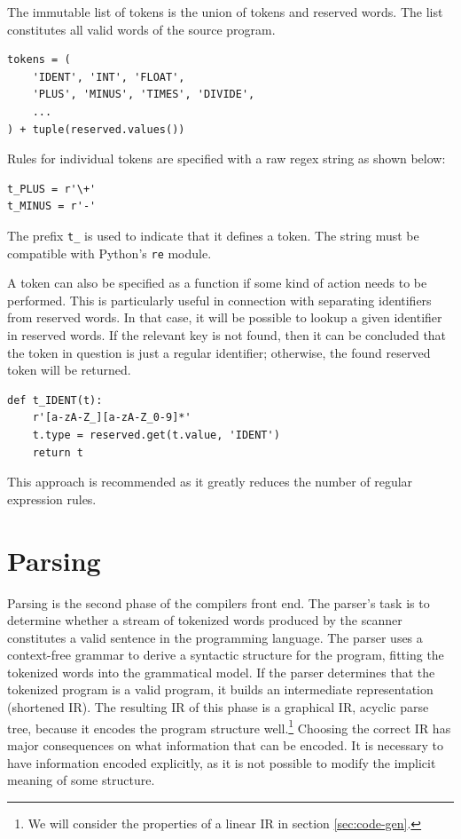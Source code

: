 The immutable list of tokens is the union of tokens and reserved words. The list constitutes all valid words of the source program.

\begin{verbatim}
tokens = (
    'IDENT', 'INT', 'FLOAT',
    'PLUS', 'MINUS', 'TIMES', 'DIVIDE',
    ...
) + tuple(reserved.values())
\end{verbatim}

Rules for individual tokens are specified with a raw regex string as shown below:

\begin{verbatim}
t_PLUS = r'\+'
t_MINUS = r'-'
\end{verbatim}

The prefix \texttt{t\_} is used to indicate that it defines a token. The string must be compatible with Python's \texttt{re} module.

A token can also be specified as a function if some kind of action needs to be performed. This is particularly useful in connection with separating identifiers from reserved words. In that case, it will be possible to lookup a given identifier in reserved words. If the relevant key is not found, then it can be concluded that the token in question is just a regular identifier; otherwise, the found reserved token will be returned.

\begin{verbatim}
def t_IDENT(t):
    r'[a-zA-Z_][a-zA-Z_0-9]*'
    t.type = reserved.get(t.value, 'IDENT')
    return t
\end{verbatim}

This approach is recommended as it greatly reduces the number of regular expression rules.

\section{Parsing}
Parsing is the second phase of the compilers front end. The parser's task is to determine whether a stream of tokenized words produced by the scanner constitutes a valid sentence in the programming language. The parser uses a context-free grammar to derive a syntactic structure for the program, fitting the tokenized words into the grammatical model. If the parser determines that the tokenized program is a valid program, it builds an intermediate representation (shortened IR). The resulting IR of this phase is a graphical IR, acyclic parse tree, because it encodes the program structure well.\footnote{We will consider the properties of a linear IR in section \ref{sec:code-gen}.} Choosing the correct IR has major consequences on what information that can be encoded. It is necessary to have information encoded explicitly, as it is not possible to modify the implicit meaning of some structure.

